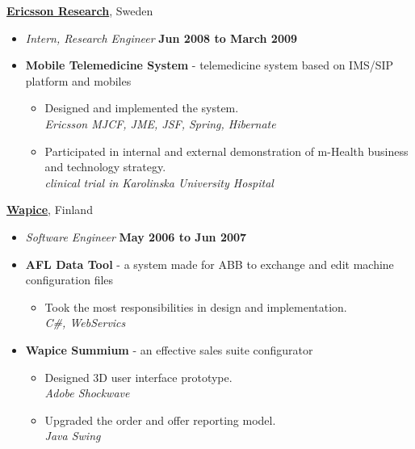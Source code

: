 \documentclass[10pt]{article}
\newenvironment{outerlist}[1][\enskip\textbullet]%
        {\begin{itemize}[#1]}{\end{itemize}%
         \vspace{-.6\baselineskip}}
\newcommand{\blankline}{\quad\pagebreak[2]}
\begin{document}
%
\href{http://www.ericsson.com/}{\textbf{Ericsson Research}},
Sweden
\begin{outerlist}

\item[] \textit{Intern, Research Engineer}%
        \hfill \textbf{Jun 2008 to March 2009}

\item[] {\textbf{Mobile Telemedicine System} - telemedicine system based on IMS/SIP platform and mobiles}
\begin{outerlist}
\item Designed and implemented the system.\\
\textit {Ericsson MJCF, JME, JSF, Spring, Hibernate} 
\item Participated in internal and external demonstration of m-Health business and technology strategy.\\
\textit {clinical trial in Karolinska University Hospital} 
\end{outerlist}
\end{outerlist}
\blankline

%
\href{http://www.wapice.com/}{\textbf{Wapice}},
Finland
\begin{outerlist}

\item[] \textit{Software Engineer}%
        \hfill \textbf{May 2006 to Jun 2007}

\item[] {\textbf{AFL Data Tool} - a system made for ABB to exchange and edit machine configuration files}
\begin{outerlist}
\item Took the most responsibilities in design and implementation.\\
\textit {C\#, WebServics}  
\end{outerlist}

\item[] {\textbf{Wapice Summium} - an effective sales suite configurator}
\begin{outerlist}
\item Designed 3D user interface prototype.\\
\textit {Adobe Shockwave}  
\item Upgraded the order and offer reporting model.\\
\textit {Java Swing}  
\end{outerlist}

\end{outerlist}
\blankline
\end{document}
